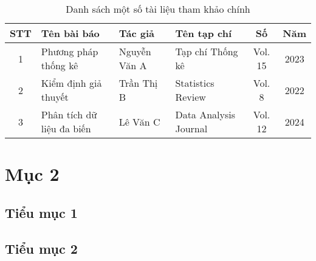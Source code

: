 \begin{table}[ht]
    \centering
    \caption{Danh sách một số tài liệu tham khảo chính}
    \label{tab:tai_lieu_tham_khao}
    \begin{tabular}{|c|l|l|l|c|c|}
		\hline
		\textbf{STT} &\textbf{Tên bài báo} & \textbf{Tác giả} & \textbf{Tên tạp chí} &\textbf{Số} & \textbf{Năm} \\
		\hline
		1 & Phương pháp thống kê & Nguyễn Văn A & Tạp chí Thống kê & Vol. 15 & 2023 \\
		\hline
		2 & Kiểm định giả thuyết & Trần Thị B & Statistics Review & Vol. 8 & 2022 \\
		\hline
        3 & Phân tích dữ liệu đa biến & Lê Văn C & Data Analysis Journal & Vol. 12 & 2024 \\
		\hline
	\end{tabular}
\end{table}
\section{Mục 2}
\subsection{Tiểu mục 1}

\subsection{Tiểu mục 2}



